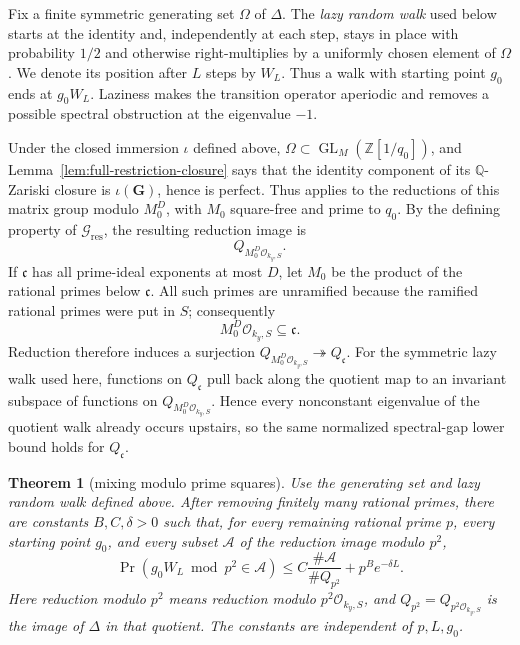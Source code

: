 \documentclass[11pt,reqno]{amsart}
\newtheorem{theorem}{Theorem}[section]
\theoremstyle{definition}
\theoremstyle{remark}
\newcommand{\Q}{\mathbb Q}
\newcommand{\Z}{\mathbb Z}
\newcommand{\cO}{\mathcal O}
\newcommand{\GL}{\operatorname{GL}}
\begin{document}
Fix a finite symmetric generating set \(\Omega\) of \(\Delta\).  The
\emph{lazy random walk} used below starts at the identity and, independently
at each step, stays in place with probability \(1/2\) and otherwise
right-multiplies by a uniformly chosen element of \(\Omega\).  We denote its
position after \(L\) steps by \(W_L\).  Thus a walk with starting point
\(g_0\) ends at \(g_0W_L\).  Laziness makes the transition operator
aperiodic and removes a possible spectral obstruction at the eigenvalue
\(-1\).

Under the closed immersion \(\iota\) defined above,
\(\Omega\subset\GL_M(\Z[1/q_0])\), and
Lemma~\ref{lem:full-restriction-closure} says that the identity component
of its \(\Q\)-Zariski closure is \(\iota(\mathbf G)\), hence is perfect.
Thus \cite[Theorem~1]{SalehiSuperII} applies to the reductions of this
matrix group modulo \(M_0^D\), with \(M_0\) square-free and prime to
\(q_0\).  By the defining property of \(\mathcal G_{\mathrm{res}}\), the
resulting reduction image is
\[
 Q_{M_0^D\cO_{k_y,S}}.
\]
If \(\mathfrak c\) has all prime-ideal exponents at most \(D\), let
\(M_0\) be the product of the rational primes below \(\mathfrak c\).  All
such primes are unramified because the ramified rational primes were put in
\(S\); consequently
\[
 M_0^D\cO_{k_y,S}\subseteq\mathfrak c.
\]
Reduction therefore induces a surjection
\(Q_{M_0^D\cO_{k_y,S}}\twoheadrightarrow Q_{\mathfrak c}\).  For the
symmetric lazy walk used here, functions on \(Q_{\mathfrak c}\) pull back
along the quotient map to an invariant subspace of functions on
\(Q_{M_0^D\cO_{k_y,S}}\).  Hence every nonconstant eigenvalue of the
quotient walk already occurs upstairs, so the same normalized spectral-gap
lower bound holds for \(Q_{\mathfrak c}\).

\begin{theorem}[mixing modulo prime squares]
\label{input:prime-square-mixing}
Use the generating set and lazy random walk defined above.  After removing finitely
many rational primes, there are constants \(B,C,\delta>0\) such that, for
every remaining rational prime \(p\), every starting point \(g_0\), and
every subset \(\mathcal A\) of the reduction image modulo \(p^2\),
\begin{equation}\label{eq:prime-square-mixing}
 \Pr(g_0W_L\bmod p^2\in\mathcal A)
 \le C\frac{\#\mathcal A}{\#Q_{p^2}}+p^B e^{-\delta L}.
\end{equation}
Here reduction modulo \(p^2\) means reduction modulo
\(p^2\cO_{k_y,S}\), and
\(Q_{p^2}=Q_{p^2\cO_{k_y,S}}\) is the image of \(\Delta\) in that
quotient.  The constants are independent of \(p,L,g_0\).
\end{theorem}
\end{document}
